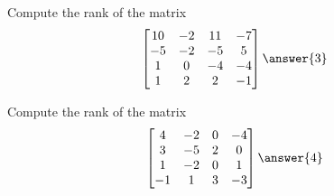 \documentclass{ximera}
\begin{document}
\begin{exercise}
    Compute the rank of the matrix
    \begin{equation*}
        \begin{bmatrix}
            10 & -2 & 11 & -7 \\ 
            -5 & -2 & -5 & 5 \\
            1 & 0 & -4 & -4 \\
            1 & 2 & 2 & -1
        \end{bmatrix} \\
        \answer{3}
    \end{equation*}
\end{exercise}

\begin{exercise}
    Compute the rank of the matrix
    \begin{equation*}
        \begin{bmatrix}
            4 & -2 & 0 & -4 \\
            3 & -5 & 2 & 0 \\
            1 & -2 & 0 & 1 \\
            -1 & 1 & 3 & -3
        \end{bmatrix} \\
        \answer{4}
    \end{equation*}
\end{exercise}
\end{document}
